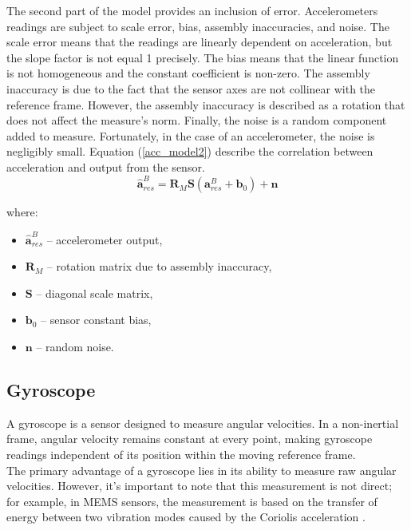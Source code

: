 The second part of the model provides an inclusion of error. Accelerometers readings are subject to scale error, bias, assembly inaccuracies, and noise.
The scale error means that the readings are linearly dependent on acceleration, but the slope factor is not equal 1 precisely. The bias means that the linear function is not homogeneous and the constant coefficient is non-zero. The assembly inaccuracy is due to the fact that the sensor axes are not collinear with the reference frame. However, the assembly inaccuracy is described as a rotation that does not affect the measure's norm. Finally, the noise is a random component added to measure. Fortunately, in the case of an accelerometer, the noise is negligibly small. Equation (\ref{acc_model2}) describe the correlation between acceleration and output from the sensor.\\


\begin{equation}
	\bm{\hat{a}}_{res}^B = \bm{R}_M \bm{S} \left( \bm{a}_{res}^B + \bm{b}_0 \right) + \bm{n}
	\label{acc_model2}
\end{equation}

where:
\begin{itemize}
	\item $\bm{\hat{a}}_{res}^B$ -- accelerometer output,
	\item $\bm{R}_M$ -- rotation matrix due to assembly inaccuracy,
	\item $\bm{S}$ -- diagonal scale matrix,
	\item $\bm{b}_0$ -- sensor constant bias,
	\item $\bm{n}$ -- random noise.	
\end{itemize}



\subsection{Gyroscope}
A gyroscope is a sensor designed to measure angular velocities. In a non-inertial frame, angular velocity remains constant at every point, making gyroscope readings independent of its position within the moving reference frame.\\

The primary advantage of a gyroscope lies in its ability to measure raw angular velocities. However, it's important to note that this measurement is not direct; for example, in MEMS sensors, the measurement is based on the transfer of energy between two vibration modes caused by the Coriolis acceleration \cite{passaro2017gyroscope}.\\

